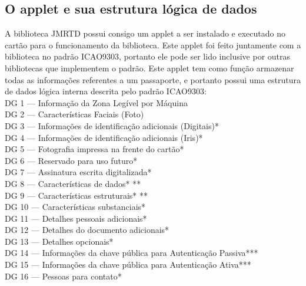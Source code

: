 \documentclass{article}
\begin{document}
	\subsection{O applet e sua estrutura lógica de dados}
		\begin{justify}

			\hspace{2cm} A biblioteca JMRTD possui consigo um applet a ser instalado e executado no cartão para o funcionamento da biblioteca. Este applet foi feito juntamente com a biblioteca no padrão ICAO9303, portanto ele pode ser lido inclusive por outras bibliotecas que implementem o padrão. Este applet tem como função armazenar todas as informações referentes a um passaporte, e portanto possui uma estrutura de dados lógica interna descrita pelo padrão ICAO9303:\\
			
			\hspace*{1.5cm} DG 1 — Informação da Zona Legível por Máquina\\
			\hspace*{2cm} DG 2 — Características Faciais (Foto)\\
			\hspace*{2cm} DG 3 — Informações de identificação adicionais (Digitais)*\\
			\hspace*{2cm} DG 4 — Informações de identificação adicionais (Iris)*\\
			\hspace*{2cm} DG 5 — Fotografia impressa na frente do cartão*\\
			\hspace*{2cm} DG 6 — Reservado para uso futuro*\\
			\hspace*{2cm} DG 7 — Assinatura escrita digitalizada*\\
			\hspace*{2cm} DG 8 — Características de dados* **\\
			\hspace*{2cm} DG 9 — Características estruturais* **\\
			\hspace*{2cm} DG 10 — Características substanciais*\\
			\hspace*{2cm} DG 11 — Detalhes pessoais adicionais*\\
			\hspace*{2cm} DG 12 — Detalhes do documento adicionais*\\
			\hspace*{2cm} DG 13 — Detalhes opcionais*\\
			\hspace*{2cm} DG 14 — Informações da chave pública para Autenticação Passiva***\\
			\hspace*{2cm} DG 15 — Informações da chave pública para Autenticação Ativa***\\
			\hspace*{2cm} DG 16 — Pessoas para contato*\\


\end{justify}
\end{document}
